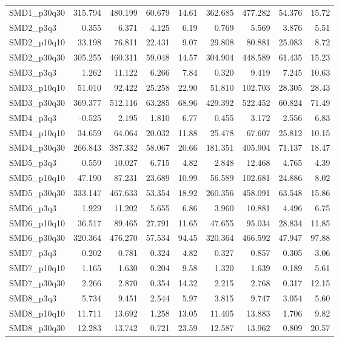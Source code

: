 \begin{longtable}{lrrrrrrrr}
SMD1\_p30q30 & 315.794 & 480.199 & 60.679 & 14.61 & 362.685 & 477.282 & 54.376 & 15.72 \\
SMD2\_p3q3 & 0.355 & 6.371 & 4.125 & 6.19 & 0.769 & 5.569 & 3.876 & 5.51 \\
SMD2\_p10q10 & 33.198 & 76.811 & 22.431 & 9.07 & 29.808 & 80.881 & 25.083 & 8.72 \\
SMD2\_p30q30 & 305.255 & 460.311 & 59.048 & 14.57 & 304.904 & 448.589 & 61.435 & 15.23 \\
SMD3\_p3q3 & 1.262 & 11.122 & 6.266 & 7.84 & 0.320 & 9.419 & 7.245 & 10.63 \\
SMD3\_p10q10 & 51.010 & 92.422 & 25.258 & 22.90 & 51.810 & 102.703 & 28.305 & 28.43 \\
SMD3\_p30q30 & 369.377 & 512.116 & 63.285 & 68.96 & 429.392 & 522.452 & 60.824 & 71.49 \\
SMD4\_p3q3 & -0.525 & 2.195 & 1.810 & 6.77 & 0.455 & 3.172 & 2.556 & 6.83 \\
SMD4\_p10q10 & 34.659 & 64.064 & 20.032 & 11.88 & 25.478 & 67.607 & 25.812 & 10.15 \\
SMD4\_p30q30 & 266.843 & 387.332 & 58.067 & 20.66 & 181.351 & 405.904 & 71.137 & 18.47 \\
SMD5\_p3q3 & 0.559 & 10.027 & 6.715 & 4.82 & 2.848 & 12.468 & 4.765 & 4.39 \\
SMD5\_p10q10 & 47.190 & 87.231 & 23.689 & 10.99 & 56.589 & 102.681 & 24.886 & 8.02 \\
SMD5\_p30q30 & 333.147 & 467.633 & 53.354 & 18.92 & 260.356 & 458.091 & 63.548 & 15.86 \\
SMD6\_p3q3 & 1.929 & 11.202 & 5.655 & 6.86 & 3.960 & 10.881 & 4.496 & 6.75 \\
SMD6\_p10q10 & 36.517 & 89.465 & 27.791 & 11.65 & 47.655 & 95.034 & 28.834 & 11.85 \\
SMD6\_p30q30 & 320.364 & 476.270 & 57.534 & 94.45 & 320.364 & 466.592 & 47.947 & 97.88 \\
SMD7\_p3q3 & 0.202 & 0.781 & 0.324 & 4.82 & 0.327 & 0.857 & 0.305 & 3.06 \\
SMD7\_p10q10 & 1.165 & 1.630 & 0.204 & 9.58 & 1.320 & 1.639 & 0.189 & 5.61 \\
SMD7\_p30q30 & 2.266 & 2.870 & 0.354 & 14.32 & 2.215 & 2.768 & 0.317 & 12.15 \\
SMD8\_p3q3 & 5.734 & 9.451 & 2.544 & 5.97 & 3.815 & 9.747 & 3.054 & 5.60 \\
SMD8\_p10q10 & 11.711 & 13.692 & 1.258 & 13.05 & 11.405 & 13.883 & 1.706 & 9.82 \\
SMD8\_p30q30 & 12.283 & 13.742 & 0.721 & 23.59 & 12.587 & 13.962 & 0.809 & 20.57 \\

\end{longtable}
